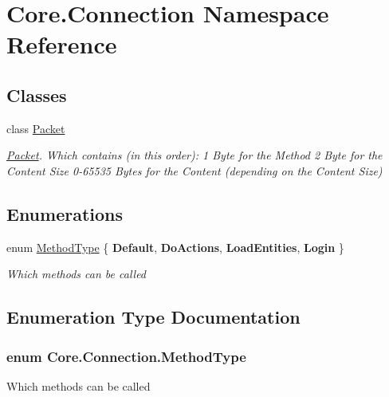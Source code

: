 \hypertarget{namespaceCore_1_1Connection}{}\section{Core.\+Connection Namespace Reference}
\label{namespaceCore_1_1Connection}
\subsection*{Classes}
\begin{DoxyCompactItemize}
\item 
class \hyperlink{classCore_1_1Connection_1_1Packet}{Packet}
\begin{DoxyCompactList}\small\item\em \hyperlink{classCore_1_1Connection_1_1Packet}{Packet}. Which contains (in this order)\+: 1 Byte for the Method 2 Byte for the Content Size 0-\/65535 Bytes for the Content (depending on the Content Size) \end{DoxyCompactList}\end{DoxyCompactItemize}
\subsection*{Enumerations}
\begin{DoxyCompactItemize}
\item 
enum \hyperlink{namespaceCore_1_1Connection_a759585506f1f7f357beb5c5460a7f4f5}{Method\+Type} \{ {\bfseries Default}, 
{\bfseries Do\+Actions}, 
{\bfseries Load\+Entities}, 
{\bfseries Login}
 \}\begin{DoxyCompactList}\small\item\em Which methods can be called \end{DoxyCompactList}
\end{DoxyCompactItemize}


\subsection{Enumeration Type Documentation}
\hypertarget{namespaceCore_1_1Connection_a759585506f1f7f357beb5c5460a7f4f5}{}
\subsubsection[{Method\+Type}]{\setlength{\rightskip}{0pt plus 5cm}enum {\bf Core.\+Connection.\+Method\+Type}\hspace{0.3cm}{\ttfamily [strong]}}\label{namespaceCore_1_1Connection_a759585506f1f7f357beb5c5460a7f4f5}


Which methods can be called 

